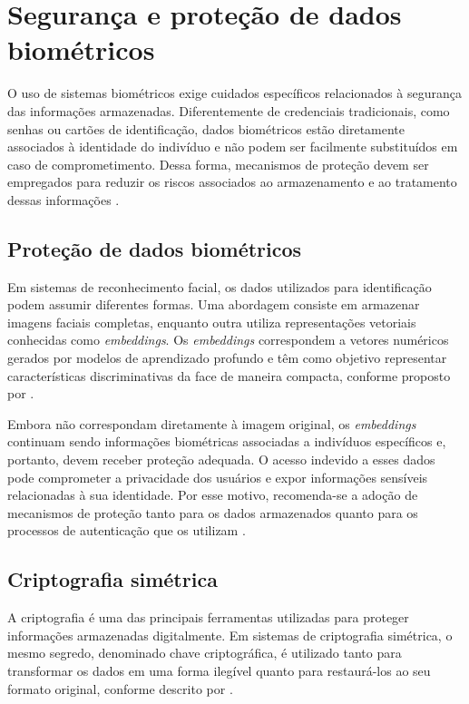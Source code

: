 \section{Segurança e proteção de dados biométricos}

O uso de sistemas biométricos exige cuidados específicos relacionados à segurança das informações armazenadas. Diferentemente de credenciais tradicionais, como senhas ou cartões de identificação, dados biométricos estão diretamente associados à identidade do indivíduo e não podem ser facilmente substituídos em caso de comprometimento. Dessa forma, mecanismos de proteção devem ser empregados para reduzir os riscos associados ao armazenamento e ao tratamento dessas informações \cite{ratha2001enhancing}.

\subsection{Proteção de dados biométricos}

Em sistemas de reconhecimento facial, os dados utilizados para identificação podem assumir diferentes formas. Uma abordagem consiste em armazenar imagens faciais completas, enquanto outra utiliza representações vetoriais conhecidas como \textit{embeddings}. Os \textit{embeddings} correspondem a vetores numéricos gerados por modelos de aprendizado profundo e têm como objetivo representar características discriminativas da face de maneira compacta, conforme proposto por \textcite{schroff2015facenet}.

Embora não correspondam diretamente à imagem original, os \textit{embeddings} continuam sendo informações biométricas associadas a indivíduos específicos e, portanto, devem receber proteção adequada. O acesso indevido a esses dados pode comprometer a privacidade dos usuários e expor informações sensíveis relacionadas à sua identidade. Por esse motivo, recomenda-se a adoção de mecanismos de proteção tanto para os dados armazenados quanto para os processos de autenticação que os utilizam \cite{ratha2001enhancing}.

\subsection{Criptografia simétrica}

A criptografia é uma das principais ferramentas utilizadas para proteger informações armazenadas digitalmente. Em sistemas de criptografia simétrica, o mesmo segredo, denominado chave criptográfica, é utilizado tanto para transformar os dados em uma forma ilegível quanto para restaurá-los ao seu formato original, conforme descrito por \textcite{stallings2017cns}.


